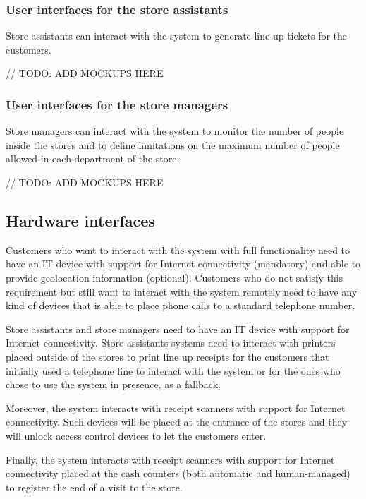 \documentclass[../../main.tex]{subfiles}
\begin{document}
  \subsubsection{User interfaces for the store assistants}

  Store assistants can interact with the system to generate line up tickets for
  the customers.

  // TODO: ADD MOCKUPS HERE

  \subsubsection{User interfaces for the store managers}

  Store managers can interact with the system to monitor the number of people
  inside the stores and to define limitations on the maximum number of people
  allowed in each department of the store.

  // TODO: ADD MOCKUPS HERE

\subsection{Hardware interfaces}

Customers who want to interact with the system with full functionality need to
have an IT device with support for Internet connectivity (mandatory) and able to
provide geolocation information (optional). Customers who do not satisfy this
requirement but still want to interact with the system remotely need to have any
kind of devices that is able to place phone calls to a standard telephone
number.

Store assistants and store managers need to have an IT device with support for
Internet connectivity. Store assistants systems need to interact with printers
placed outside of the stores to print line up receipts for the customers that
initially used a telephone line to interact with the system or for the ones who
chose to use the system in presence, as a fallback.

Moreover, the system interacts with receipt scanners with support for Internet
connectivity. Such devices will be placed at the entrance of the stores and they
will unlock access control devices to let the customers enter. 

Finally, the system interacts with receipt scanners with support for Internet
connectivity placed at the cash counters (both automatic and human-managed) to
register the end of a visit to the store.
\end{document}
